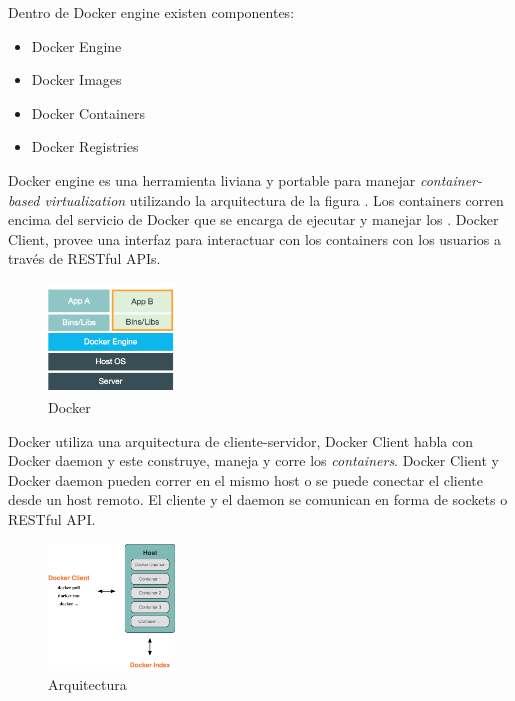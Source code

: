 \documentclass[letter,10pt]{article}
\begin{document}
  	Dentro de Docker engine existen  componentes: 
	\begin{itemize}
		\item Docker Engine
		\item Docker Images
		\item Docker Containers
		\item Docker Registries
	\end{itemize}
	

Docker engine es una herramienta liviana y portable para manejar \textit{container-based virtualization} utilizando la arquitectura de la figura \label{fig:docker}. Los containers corren encima del servicio de Docker que se encarga de ejecutar y manejar los \containers. Docker Client, provee una interfaz para interactuar con los containers con los usuarios a través de RESTful APIs. \cite{bui2015analysis}\\

\begin{figure}[H]
  \centering
    \includegraphics[width=0.3\textwidth]{images/docker.png}
    \caption{Docker}
    \label{fig:docker}
\end{figure}

	Docker utiliza una arquitectura de cliente-servidor, Docker Client habla con Docker daemon y este construye, maneja y corre los \textit{containers}. Docker Client y Docker daemon pueden correr en el mismo host o se puede conectar el cliente desde un host remoto. El cliente y el daemon se comunican en forma de sockets o RESTful API. \cite{Docker:2015:understanding}
	
\begin{figure}[H]
  \centering
    \includegraphics[width=0.3\textwidth]{images/architecture.png}
    \caption{Arquitectura}
    \label{fig:arquitectura}
\end{figure}	
	
\end{document}
